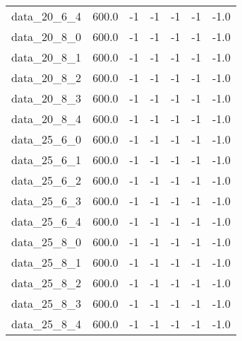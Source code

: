 \begin{tabular}{rrrrrrr}
  data\_20\_6\_4 & 600.0 & -1 & -1 & -1 & -1 & -1.0 \\
  data\_20\_8\_0 & 600.0 & -1 & -1 & -1 & -1 & -1.0 \\
  data\_20\_8\_1 & 600.0 & -1 & -1 & -1 & -1 & -1.0 \\
  data\_20\_8\_2 & 600.0 & -1 & -1 & -1 & -1 & -1.0 \\
  data\_20\_8\_3 & 600.0 & -1 & -1 & -1 & -1 & -1.0 \\
  data\_20\_8\_4 & 600.0 & -1 & -1 & -1 & -1 & -1.0 \\
  data\_25\_6\_0 & 600.0 & -1 & -1 & -1 & -1 & -1.0 \\
  data\_25\_6\_1 & 600.0 & -1 & -1 & -1 & -1 & -1.0 \\
  data\_25\_6\_2 & 600.0 & -1 & -1 & -1 & -1 & -1.0 \\
  data\_25\_6\_3 & 600.0 & -1 & -1 & -1 & -1 & -1.0 \\
  data\_25\_6\_4 & 600.0 & -1 & -1 & -1 & -1 & -1.0 \\
  data\_25\_8\_0 & 600.0 & -1 & -1 & -1 & -1 & -1.0 \\
  data\_25\_8\_1 & 600.0 & -1 & -1 & -1 & -1 & -1.0 \\
  data\_25\_8\_2 & 600.0 & -1 & -1 & -1 & -1 & -1.0 \\
  data\_25\_8\_3 & 600.0 & -1 & -1 & -1 & -1 & -1.0 \\
  data\_25\_8\_4 & 600.0 & -1 & -1 & -1 & -1 & -1.0 \\\hline
\end{tabular}
